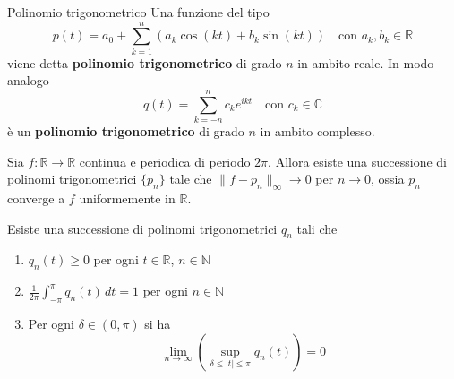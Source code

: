 \begin{definition}[label=def:polinomio_trig]{Polinomio trigonometrico}
Una funzione del tipo
\[
    p{(t)} = a_{0} + \sum_{k=1}^{n} {(a_{k} \cos{(kt)} + b_{k} \sin{(kt)})} \quad
    \text{con } a_{k}, b_{k} \in \mathbb{R}
\]
viene detta \textbf{polinomio trigonometrico} di grado \(n\) in ambito reale.
In modo analogo 
\[
    q{(t)} = \sum_{k=-n}^{n} c_{k} e ^{ikt} \quad \text{con } c_{k} \in \mathbb{C}
\]
è un \textbf{polinomio trigonometrico} di grado \(n\) in ambito complesso.
\end{definition}
\begin{theorem}[Weierstrass]\label{thm:weierstrass}
     Sia \(f : \mathbb{R} \to  \mathbb{R}\) continua e periodica di periodo
     \(2\pi\). Allora esiste una successione di polinomi trigonometrici
     \(\{p_{n}\} \) tale che \(\|f - p_{n}\|_{\infty} \to 0\) per \(n \to 0\),
     ossia \(p_{n}\) converge a \(f\) uniformemente in \(\mathbb{R}\).
\end{theorem}
\begin{lemma}
    Esiste una successione di polinomi trigonometrici \(q_{n}\) tali che 
\begin{enumerate}[label = \alph*.]
    \item \(q_{n}{(t)} \ge 0\) per ogni \(t \in \mathbb{R}\), \(n \in
        \mathbb{N}\)
    \item \(\frac{1}{2\pi}\int_{-\pi}^{\pi} q_{n}{(t)} \,dt = 1\) per ogni \(n
        \in \mathbb{N}\)
    \item Per ogni \(\delta \in {(0, \pi)}\) si ha 
        \[
          \lim_{n \to \infty} {\left( \sup_{\delta \le |t| \le \pi} q_{n}{(t)}
          \right)} = 0
        \]
\end{enumerate}
\end{lemma}
